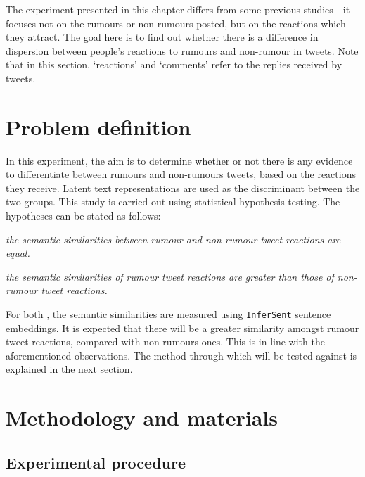The experiment presented in this chapter differs from some previous studies—it focuses not on the rumours or non-rumours posted, but on the reactions which they attract. The goal here is to find out whether there is a difference in dispersion between people’s reactions to rumours and non-rumour in tweets. Note that in this section, `reactions' and `comments' refer to the replies received by tweets.

\section{Problem definition}
\label{sec:3-problem}

In this experiment, the aim is to determine whether or not there is any evidence to differentiate between rumours and non-rumours tweets, based on the reactions they receive. Latent text representations are used as the discriminant between the two groups. This study is carried out using statistical hypothesis testing. The hypotheses can be stated as follows:

\begin{hyp}
  [Null] \label{hyp:a}\textit{the semantic similarities between rumour and non-rumour tweet reactions are equal.}
\end{hyp}
\begin{hyp}
  [Alternative] \label{hyp:b}\textit{the semantic similarities of rumour tweet reactions are greater than those of non-rumour tweet reactions.}
\end{hyp}

For both , the semantic similarities are measured using \texttt{InferSent} sentence embeddings. It is expected that there will be a greater similarity amongst rumour tweet reactions, compared with non-rumours ones. This is in line with the aforementioned observations. The method through which  will be tested against  is explained in the next section.

\section{Methodology and materials}
\label{sec:3-methodology}

\subsection{Experimental procedure}
\label{ssec:3-experimental-procedure}

